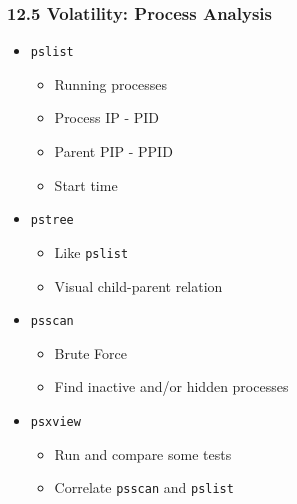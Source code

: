 \begin{frame}[fragile]
  \frametitle{12.5 Volatility: Process Analysis}
    \begin{itemize}
        \item[] \texttt{pslist}
            \begin{itemize}
                \item Running processes
                \item Process IP - PID
                \item Parent PIP - PPID
                \item Start time
            \end{itemize}
        \item[] \texttt{pstree}
            \begin{itemize}
                \item Like \texttt{pslist}
                \item Visual child-parent relation
            \end{itemize}
        \item[] \texttt{psscan}
            \begin{itemize}
                \item Brute Force
                \item Find inactive and/or hidden processes
            \end{itemize}
        \item[] \texttt{psxview}
            \begin{itemize}
                \item Run and compare some tests
                \item Correlate \texttt{psscan} and \texttt{pslist}
            \end{itemize}
    \end{itemize}
\end{frame}


